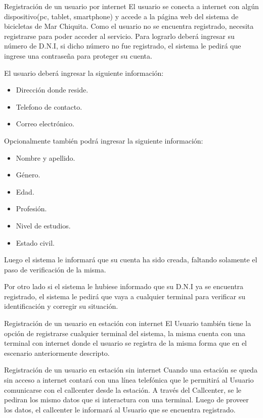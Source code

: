 
\begin{subsection}{Registración de un usuario por internet}
El usuario se conecta a internet con algún dispositivo(pc, tablet, smartphone) y accede a la página
web del sistema de bicicletas de Mar Chiquita. Como el usuario no se encuentra registrado, necesita 
registrarse para poder acceder al servicio. Para lograrlo deberá ingresar su número de D.N.I, si dicho
número no fue registrado, el sistema le pedirá que ingrese una contraseña para proteger su cuenta.

El usuario deberá ingresar la siguiente información:
	\begin{itemize}
	\item Dirección donde reside.
	\item Telefono de contacto.
	\item Correo electrónico.
	\end{itemize}
	
Opcionalmente también podrá ingresar la siguiente información:

	\begin{itemize}
	\item Nombre y apellido.
	\item Género.
	\item Edad.
	\item Profesión.
	\item Nivel de estudios.
	\item Estado civil.
	\end{itemize}
	
Luego el sistema le informará que su cuenta ha sido creada, faltando solamente el paso de verificación de la misma.

Por otro lado si el sistema le hubiese informado que su D.N.I ya se encuentra registrado, el sistema le pedirá
que vaya a cualquier terminal para verificar su identificación y corregir su situación.
\end{subsection}

\begin{subsection}{Registración de un usuario en estación con internet}
El Usuario también tiene la opción de registrarse cualquier terminal del sistema, la misma cuenta con una terminal
con internet donde el usuario se registra de la misma forma que en el escenario anteriormente descripto.
\end{subsection}

\begin{subsection}{Registración de un usuario en estación sin internet }
Cuando una estación se queda sin acceso a internet contará con una línea telefónica que le permitirá al Usuario 
 comunicarse con el callcenter desde la estación. A través del Callcenter, se le pediran los mismo datos que si interactura con una terminal. Luego de proveer los datos, el callcenter le informará al Usuario que se encuentra registrado.
\end{subsection}

